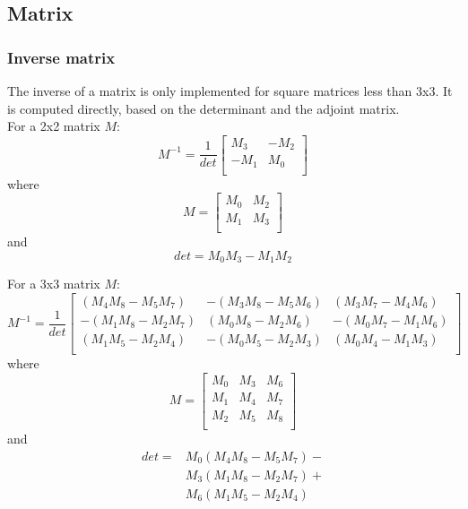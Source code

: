 \subsection{Matrix}

\subsubsection{Inverse matrix}

The inverse of a matrix is only implemented for square matrices less than 3x3. It is computed directly, based on the determinant and the adjoint matrix.\\

For a 2x2 matrix $M$:\\

\begin{equation}
M^{-1}=\frac{1}{det}\left[\begin{array}{cc}
M_3&-M_2\\
-M_1&M_0\\
\end{array}\right]
\end{equation}
where
\begin{equation}
M=\left[\begin{array}{cc}
M_0&M_2\\
M_1&M_3\\
\end{array}\right]
\end{equation}
and
\begin{equation}
det=M_0M_3-M_1M_2
\end{equation}

For a 3x3 matrix $M$:\\

\begin{equation}
M^{-1}=\frac{1}{det}\left[\begin{array}{ccc}
(M_4M_8-M_5M_7)&-(M_3M_8-M_5M_6)&(M_3M_7-M_4M_6)\\
-(M_1M_8-M_2M_7)&(M_0M_8-M_2M_6)&-(M_0M_7-M_1M_6)\\
(M_1M_5-M_2M_4)&-(M_0M_5-M_2M_3)&(M_0M_4-M_1M_3)\\
\end{array}\right]
\end{equation}
where
\begin{equation}
M=\left[\begin{array}{ccc}
M_0&M_3&M_6\\
M_1&M_4&M_7\\
M_2&M_5&M_8\\
\end{array}\right]
\end{equation}
and
\begin{equation}
\begin{array}{ll}
det=&M_0(M_4M_8-M_5M_7)-\\
&M_3(M_1M_8-M_2M_7)+\\
&M_6(M_1M_5-M_2M_4)\\
\end{array}
\end{equation}

